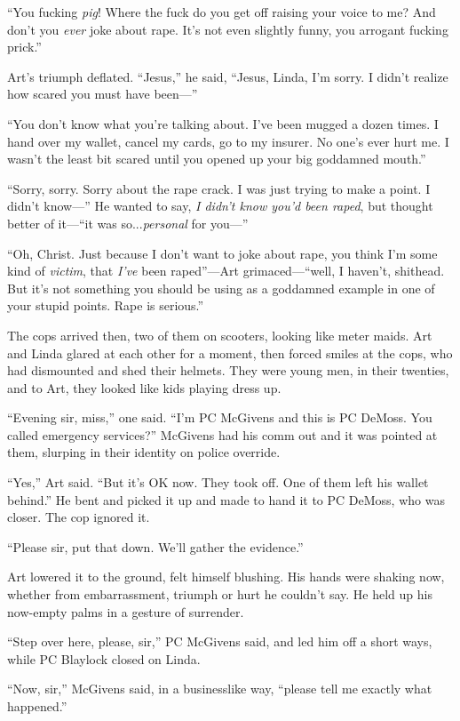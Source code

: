 “You fucking \emph{pig}! Where the fuck do you get off raising your
voice to me? And don’t you \emph{ever} joke about rape. It’s not
even slightly funny, you arrogant fucking prick.”

Art’s triumph deflated. “Jesus,” he said, “Jesus, Linda, I’m sorry.
I didn’t realize how scared you must have been—”

“You don’t know what you’re talking about. I’ve been mugged a dozen
times. I hand over my wallet, cancel my cards, go to my insurer. No
one’s ever hurt me. I wasn’t the least bit scared until you opened
up your big goddamned mouth.”

“Sorry, sorry. Sorry about the rape crack. I was just trying to
make a point. I didn’t know—” He wanted to say,
\emph{I didn’t know you’d been raped}, but thought better of it—“it
was so...\emph{personal} for you—”

“Oh, Christ. Just because I don’t want to joke about rape, you
think I’m some kind of \emph{victim}, that \emph{I’ve} been
raped”—Art grimaced—“well, I haven’t, shithead. But it’s not
something you should be using as a goddamned example in one of your
stupid points. Rape is serious.”

The cops arrived then, two of them on scooters, looking like meter
maids. Art and Linda glared at each other for a moment, then forced
smiles at the cops, who had dismounted and shed their helmets. They
were young men, in their twenties, and to Art, they looked like
kids playing dress up.

“Evening sir, miss,” one said. “I’m PC McGivens and this is PC
DeMoss. You called emergency services?” McGivens had his comm out
and it was pointed at them, slurping in their identity on police
override.

“Yes,” Art said. “But it’s OK now. They took off. One of them left
his wallet behind.” He bent and picked it up and made to hand it to
PC DeMoss, who was closer. The cop ignored it.

“Please sir, put that down. We’ll gather the evidence.”

Art lowered it to the ground, felt himself blushing. His hands were
shaking now, whether from embarrassment, triumph or hurt he
couldn’t say. He held up his now-empty palms in a gesture of
surrender.

“Step over here, please, sir,” PC McGivens said, and led him off a
short ways, while PC Blaylock closed on Linda.

“Now, sir,” McGivens said, in a businesslike way, “please tell me
exactly what happened.”

